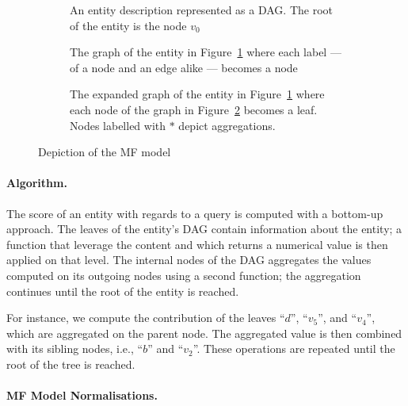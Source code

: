 \begin{figure}
	\centering
	\begin{subfigure}{.3\textwidth}
		\centering
		\resizebox{\textwidth}{!}{
			
		}
		\caption{An entity description represented as a DAG. The root of the entity is the node $v_0$}
		\label{fig:concept-tree}
	\end{subfigure}
	\quad
	\begin{subfigure}{.3\textwidth}
		\centering
		\resizebox{\textwidth}{!}{
			
		}
		\caption{The graph of the entity in Figure~\ref{fig:concept-tree} where each label --- of a node and an edge alike --- becomes a node}
		\label{fig:expanded-graph1}
	\end{subfigure}
	\qquad
	\begin{subfigure}{.7\textwidth}
		\centering
		\resizebox{\textwidth}{!}{
			
		}
		\caption{The expanded graph of the entity in Figure~\ref{fig:concept-tree} where each node of the graph in Figure~\ref{fig:expanded-graph1} becomes a leaf. Nodes labelled with $*$ depict aggregations.}
		\label{fig:expanded-graph2}
	\end{subfigure}
	\caption[Depiction of the MF model]{Depiction of the \gls{MF} model}
\end{figure}

\paragraph{Algorithm.}

The score of an entity with regards to a query is computed with a bottom-up approach. The leaves of the entity's DAG contain information about the entity; a function that leverage the content and which returns a numerical value is then applied on that level. The internal nodes of the DAG aggregates the values computed on its outgoing nodes using a second function; the aggregation continues until the root of the entity is reached.

For instance, we compute the contribution of the leaves ``$d$'', ``$v_5$'', and ``$v_4$'', which are aggregated on the parent node. The aggregated value is then combined with its sibling nodes, i.e., ``$b$'' and ``$v_2$''. These operations are repeated until the root of the tree is reached.

\paragraph{MF Model Normalisations.}
\label{chap:tree-ranking:mf-model:norm}

